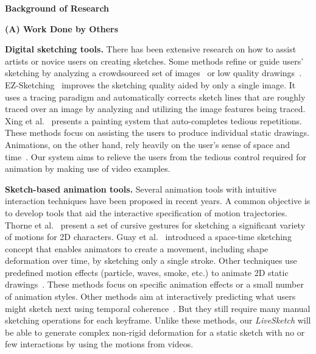 \textbf{Background of Research}

\textbf{(A) Work Done by Others}

\textbf{Digital sketching tools.} There has been extensive research on how to assist artists or novice users on creating sketches. 
Some methods refine or guide users' sketching by analyzing a crowdsourced set of  images~\cite{Lee:2011} or low quality drawings~\cite{Gingold:2012}. EZ-Sketching~\cite{EZSketching:2014} improves the sketching quality aided by only a single image.  
It uses a tracing paradigm and automatically corrects sketch lines that are roughly traced over an image 
by analyzing and utilizing the image features being traced. 
Xing et al.~\cite{Xing:2014} presents a painting system that auto-completes tedious repetitions. These methods focus on assisting the users to produce individual static drawings. Animations, on the other hand, rely heavily on the user's sense of space and time~\cite{Sohn:2012,Benard:2013}. Our system aims to relieve the users from the tedious control required for animation by making use of video examples.

{\textbf{Sketch-based animation tools.} Several animation tools with intuitive interaction techniques have been proposed in recent years. A common objective 
is to develop tools that aid the interactive specification of motion 
trajectories.  Thorne et al.~\cite{Thorne:2004} present a set of cursive gestures for sketching a significant 
variety of motions for 2D characters.
Guay et al.~\cite{Guay:2015} introduced a space-time sketching concept that enables animators to create a movement, including shape deformation over time, by sketching only a single stroke.
Other techniques use predefined motion effects (particle, waves, smoke, etc.) to animate 2D static 
drawings~\cite{Kazi:2014,Xing:2016}. These methods focus on 
specific animation effects or a small number of animation styles. 
Other methods aim at interactively predicting what users might sketch next using temporal 
coherence~\cite{Wang:2004,Agarwala:2004,Xing:2015}. 
But they still require many manual sketching operations for each keyframe.
Unlike these methods, our \textit{LiveSketch} will be able to generate complex non-rigid deformation for a static sketch with no or few interactions by using the motions from videos.
}


